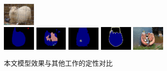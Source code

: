 {\begin{figure}
\begin{subfigure}{0.55\textwidth}
		\includegraphics[width=0.18\textwidth]{image/result/compare/im_sheep.pdf}
		\\
		\includegraphics[width=0.18\textwidth]{image/result/compare/my_boat.png}
		\includegraphics[width=0.18\textwidth]{image/result/compare/fcn_boat.png}
		\includegraphics[width=0.18\textwidth]{image/result/compare/sds_boat.png}
		\includegraphics[width=0.18\textwidth]{image/result/compare/2007_004241.png}
		\includegraphics[width=0.18\textwidth]{image/result/compare/2007_004241.jpg}
		\caption{本文模型效果与其他工作的定性对比}
		\label{fig:compare1}
	\end{subfigure}
	\begin{subfigure}{0.4\textwidth}
		\centering


\end{subfigure}
\end{figure}}

